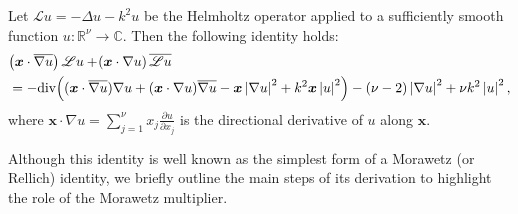\documentclass[twoside,11pt]{article}
\def\dimx{\nu }
\def\div{\text{\rm div}}
\def\L{{\mathscr{L}}}
\newcommand{\qp}[1]{\ensuremath{\!\left({#1}\right)}}
\newcommand{\norm}[1]{\ensuremath{\left|#1\right|}}
\renewcommand{\vec}[1]{\boldsymbol{#1}}
\def\L{{\mathscr{L}}}
\begin{document}
{  Let $\L u = -\Delta u - k^2 u$ be the Helmholtz operator applied to a
  sufficiently smooth function $u \colon \mathbb{R}^\dimx \to
  \mathbb{C}$. Then the following identity holds:
  \begin{align}\label{rellich_id}
    &\qp{\vec{x} \cdot \overline{\nabla u}} \L  u
    +
    \qp{\vec{x} \cdot \nabla u} \overline{\L  u} \nonumber\\
    &=
       -\div\qp{
      (\vec{x} \cdot \overline{\nabla u}) \nabla u
      +
      (\vec{x} \cdot \nabla u) \overline{\nabla u}
      -
      \vec{x} \norm{\nabla u}^2
      +
      k^2 \vec{x} \norm{u}^2
    }
    -
    (\dimx -2) \norm{\nabla u}^2
    +
    \dimx k^2 \norm{u}^2 ,
  \end{align}
where $\vec{x} \cdot \nabla u = \sum_{{  j=1}}^{\dimx} x_j \frac{\partial u}{\partial x_j}$ is the directional derivative {  of $u$} along $\vec{x}$.

Although this identity is well known \cite{CummingsFeng2006, Spence_Chandler-Wilde_integral_2011, Moiola_Spence2014} as the simplest form of a Morawetz {  (or Rellich)} identity, we briefly outline the main {  steps of its derivation} to highlight the role of the Morawetz multiplier.

}
\end{document}
